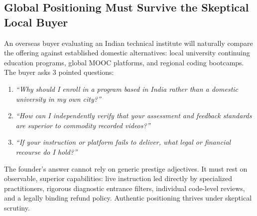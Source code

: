 \subsection{Global Positioning Must Survive the Skeptical Local Buyer}
\label{sec:surviving_skeptical_local_buyer}

An overseas buyer evaluating an Indian technical institute will naturally compare the offering against established domestic alternatives: local university continuing education programs, global MOOC platforms, and regional coding bootcamps. The buyer asks 3 pointed questions:
\begin{enumerate}
\item \textit{``Why should I enroll in a program based in India rather than a domestic university in my own city?''}
\item \textit{``How can I independently verify that your assessment and feedback standards are superior to commodity recorded videos?''}
\item \textit{``If your instruction or platform fails to deliver, what legal or financial recourse do I hold?''}
\end{enumerate}
The founder's answer cannot rely on generic prestige adjectives. It must rest on observable, superior capabilities: live instruction led directly by specialized practitioners, rigorous diagnostic entrance filters, individual code-level reviews, and a legally binding refund policy. Authentic positioning thrives under skeptical scrutiny.
